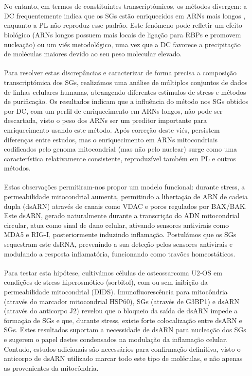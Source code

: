  \\
 \\
 No entanto, em termos de constituintes transcriptómicos, os métodos divergem: a DC frequentemente indica que os SGs estão enriquecidos em ARNs mais longos\cite{khong_stress_2017} , enquanto a PL não reproduz esse padrão\cite{somasekharan_g3bp1-linked_2020}. Este fenómeno pode refletir um efeito biológico (ARNs longos possuem mais locais de ligação para RBPs e promovem nucleação\cite{khong_stress_2017}) ou um viés metodológico, uma vez que a DC favorece a precipitação de moléculas maiores devido ao seu peso molecular elevado\cite{glauninger_stressful_2022}.
 \\
 \\
 Para resolver estas discrepâncias e caracterizar de forma precisa a composição transcriptómica dos SGs, realizámos uma análise de múltiplos conjuntos de dados de linhas celulares humanas, abrangendo diferentes estímulos de stress e métodos de purificação. Os resultados indicam que a influência do método nos SGs obtidos por DC, com um perfil de enriquecimento em ARNs longos, não pode ser descartada, visto o peso dos ARNs ser um preditor importante para enriquecimento usando este método. Após correção deste viés, persistem diferenças entre estudos, mas o enriquecimento em ARNs mitocondriais codificados pelo genoma mitocondrial (mas não pelo nuclear\cite{wu_rnalocate_2025}) surge como uma característica relativamente consistente, reproduzível também em PL e outros métodos.
 \\
 \\
 Estas observações permitiram-nos propor um modelo funcional: durante stress, a permeabilidade mitocondrial aumenta, permitindo a libertação de ARN de cadeia dupla (dsARN) através de canais como VDAC e poros regulados por BAX/BAK\cite{krieger_trafficking_2024}. Este dsARN, gerado naturalmente durante a transcrição do ADN mitocondrial circular, atua como sinal de dano celular, ativando sensores antivirais como MDA5 e RIG-I, posteriormente induzindo inflamação\cite{dhir_mitochondrial_2018}. Postulámos que os SGs sequestram este dsRNA, prevenindo a sua deteção pelos sensores antivirais e modulando a resposta inflamatória, funcionando como travões homeostáticos. 
 \\
 \\
 Para testar esta hipótese, cultivámos células de osteossarcoma U2-OS em condições de stress hiperosmótico (sorbitol\cite{matheny_rna_2021}), com ou sem inibição da permeabilidade mitocondrial (DIDS\cite{krieger_trafficking_2024}). Imunofluorescência para mitocôndria (através do marcador mitocondrial HSP60\cite{el_manaa_transcription-_2021}), SGs (através de G3BP1\cite{khong_stress_2017}) e dsARN (através do anticorpo J2\cite{krieger_trafficking_2024}) revelou que o bloqueio da saída de dsARN impede a formação de SGs e que, durante stress, existe forte colocalização entre dsARN e SGs. Estes resultados suportam a necessidade de dsARN para nucleação dos SGs e sugerem o papel destes condensados na modulação da inflamação celular. Contudo, estudos adicionais são necessários para confirmação definitiva, visto o anticorpo de dsARN utilizado marcar todo este tipo de moléculas\cite{krieger_trafficking_2024}, e não apenas as provenientes da mitocôndria.
